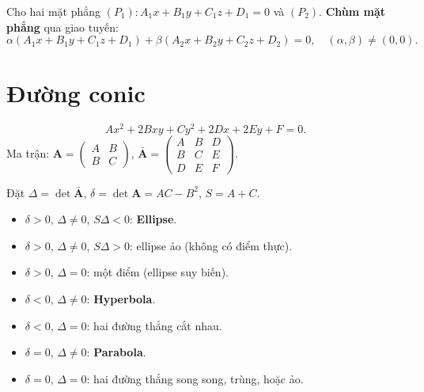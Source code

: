 \documentclass[12pt,a4paper]{article}
\begin{document}
\begin{phuongphap}[title={Chùm mặt phẳng}]
  Cho hai mặt phẳng $(P_1): A_1 x + B_1 y + C_1 z + D_1 = 0$ và $(P_2)$. \textbf{Chùm mặt phẳng} qua giao tuyến:
  \[
    \alpha(A_1 x + B_1 y + C_1 z + D_1) + \beta(A_2 x + B_2 y + C_2 z + D_2) = 0, \quad (\alpha, \beta) \ne (0, 0).
  \]
\end{phuongphap}

\section{Đường conic}

\begin{dinhnghia}[title={Đường bậc hai tổng quát trên $\mathbb{R}^2$}]
  \[
    Ax^2 + 2Bxy + Cy^2 + 2Dx + 2Ey + F = 0.
  \]
  Ma trận: $\mathbf{A} = \begin{pmatrix} A & B \\ B & C \end{pmatrix}$, \quad $\bar{\mathbf{A}} = \begin{pmatrix} A & B & D \\ B & C & E \\ D & E & F \end{pmatrix}$.
\end{dinhnghia}

\begin{phuongphap}[title={Phân loại đường conic (bất biến)}]
  Đặt $\Delta = \det \bar{\mathbf{A}}$, $\delta = \det \mathbf{A} = AC - B^2$, $S = A + C$.
  \begin{itemize}
    \item $\delta > 0$, $\Delta \ne 0$, $S\Delta < 0$: \textbf{Ellipse}.
    \item $\delta > 0$, $\Delta \ne 0$, $S\Delta > 0$: ellipse ảo (không có điểm thực).
    \item $\delta > 0$, $\Delta = 0$: một điểm (ellipse suy biến).
    \item $\delta < 0$, $\Delta \ne 0$: \textbf{Hyperbola}.
    \item $\delta < 0$, $\Delta = 0$: hai đường thẳng cắt nhau.
    \item $\delta = 0$, $\Delta \ne 0$: \textbf{Parabola}.
    \item $\delta = 0$, $\Delta = 0$: hai đường thẳng song song, trùng, hoặc ảo.
  \end{itemize}
\end{phuongphap}
\end{document}
